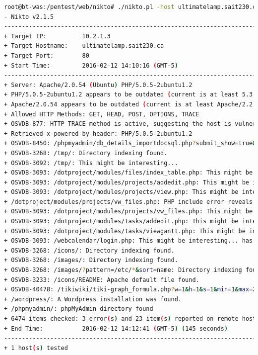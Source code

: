 \documentclass{article}
\begin{document}
\begin{lstlisting}[language=Bash]
root@bt-was:/pentest/web/nikto# ./nikto.pl -host ultimatelamp.sait230.ca -p 80
- Nikto v2.1.5
---------------------------------------------------------------------------
+ Target IP:          10.2.1.3
+ Target Hostname:    ultimatelamp.sait230.ca
+ Target Port:        80
+ Start Time:         2016-02-12 14:10:16 (GMT-5)
---------------------------------------------------------------------------
+ Server: Apache/2.0.54 (Ubuntu) PHP/5.0.5-2ubuntu1.2
+ PHP/5.0.5-2ubuntu1.2 appears to be outdated (current is at least 5.3.6)
+ Apache/2.0.54 appears to be outdated (current is at least Apache/2.2.19). Apache 1.3.42 (final release) and 2.0.64 are also current.
+ Allowed HTTP Methods: GET, HEAD, POST, OPTIONS, TRACE 
+ OSVDB-877: HTTP TRACE method is active, suggesting the host is vulnerable to XST
+ Retrieved x-powered-by header: PHP/5.0.5-2ubuntu1.2
+ OSVDB-8450: /phpmyadmin/db_details_importdocsql.php?submit_show=true&do=import&docpath=../: phpMyAdmin allows directory listings remotely. Upgrade to version 2.5.3 or higher. http://www.securityfocus.com/bid/7963.
+ OSVDB-3268: /tmp/: Directory indexing found.
+ OSVDB-3092: /tmp/: This might be interesting...
+ OSVDB-3093: /dotproject/modules/files/index_table.php: This might be interesting... has been seen in web logs from an unknown scanner.
+ OSVDB-3093: /dotproject/modules/projects/addedit.php: This might be interesting... has been seen in web logs from an unknown scanner.
+ OSVDB-3093: /dotproject/modules/projects/view.php: This might be interesting... has been seen in web logs from an unknown scanner.
+ /dotproject/modules/projects/vw_files.php: PHP include error reveals the full path to the web root.
+ OSVDB-3093: /dotproject/modules/projects/vw_files.php: This might be interesting... has been seen in web logs from an unknown scanner.
+ OSVDB-3093: /dotproject/modules/tasks/addedit.php: This might be interesting... has been seen in web logs from an unknown scanner.
+ OSVDB-3093: /dotproject/modules/tasks/viewgantt.php: This might be interesting... has been seen in web logs from an unknown scanner.
+ OSVDB-3093: /webcalendar/login.php: This might be interesting... has been seen in web logs from an unknown scanner.
+ OSVDB-3268: /icons/: Directory indexing found.
+ OSVDB-3268: /images/: Directory indexing found.
+ OSVDB-3268: /images/?pattern=/etc/*&sort=name: Directory indexing found.
+ OSVDB-3233: /icons/README: Apache default file found.
+ OSVDB-40478: /tikiwiki/tiki-graph_formula.php?w=1&h=1&s=1&min=1&max=2&f[]=x.tan.phpinfo()&t=png&title=http://cirt.net/rfiinc.txt?: TikiWiki contains a vulnerability which allows remote attackers to execute arbitrary PHP code.
+ /wordpress/: A Wordpress installation was found.
+ /phpmyadmin/: phpMyAdmin directory found
+ 6474 items checked: 3 error(s) and 23 item(s) reported on remote host
+ End Time:           2016-02-12 14:12:41 (GMT-5) (145 seconds)
---------------------------------------------------------------------------
+ 1 host(s) tested
\end{lstlisting}

\newpage
\begin{appendix}
	\listoffigures
\end{appendix}
\end{document}
